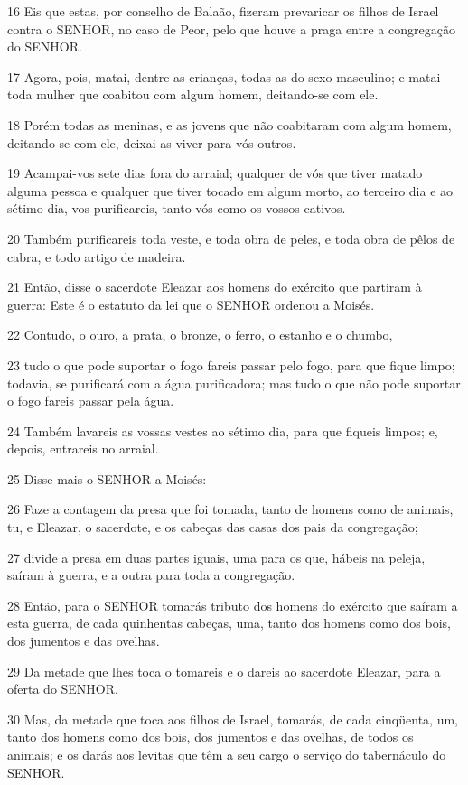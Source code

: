 \par 16 Eis que estas, por conselho de Balaão, fizeram prevaricar os filhos de Israel contra o SENHOR, no caso de Peor, pelo que houve a praga entre a congregação do SENHOR.
\par 17 Agora, pois, matai, dentre as crianças, todas as do sexo masculino; e matai toda mulher que coabitou com algum homem, deitando-se com ele.
\par 18 Porém todas as meninas, e as jovens que não coabitaram com algum homem, deitando-se com ele, deixai-as viver para vós outros.
\par 19 Acampai-vos sete dias fora do arraial; qualquer de vós que tiver matado alguma pessoa e qualquer que tiver tocado em algum morto, ao terceiro dia e ao sétimo dia, vos purificareis, tanto vós como os vossos cativos.
\par 20 Também purificareis toda veste, e toda obra de peles, e toda obra de pêlos de cabra, e todo artigo de madeira.
\par 21 Então, disse o sacerdote Eleazar aos homens do exército que partiram à guerra: Este é o estatuto da lei que o SENHOR ordenou a Moisés.
\par 22 Contudo, o ouro, a prata, o bronze, o ferro, o estanho e o chumbo,
\par 23 tudo o que pode suportar o fogo fareis passar pelo fogo, para que fique limpo; todavia, se purificará com a água purificadora; mas tudo o que não pode suportar o fogo fareis passar pela água.
\par 24 Também lavareis as vossas vestes ao sétimo dia, para que fiqueis limpos; e, depois, entrareis no arraial.
\par 25 Disse mais o SENHOR a Moisés:
\par 26 Faze a contagem da presa que foi tomada, tanto de homens como de animais, tu, e Eleazar, o sacerdote, e os cabeças das casas dos pais da congregação;
\par 27 divide a presa em duas partes iguais, uma para os que, hábeis na peleja, saíram à guerra, e a outra para toda a congregação.
\par 28 Então, para o SENHOR tomarás tributo dos homens do exército que saíram a esta guerra, de cada quinhentas cabeças, uma, tanto dos homens como dos bois, dos jumentos e das ovelhas.
\par 29 Da metade que lhes toca o tomareis e o dareis ao sacerdote Eleazar, para a oferta do SENHOR.
\par 30 Mas, da metade que toca aos filhos de Israel, tomarás, de cada cinqüenta, um, tanto dos homens como dos bois, dos jumentos e das ovelhas, de todos os animais; e os darás aos levitas que têm a seu cargo o serviço do tabernáculo do SENHOR.
